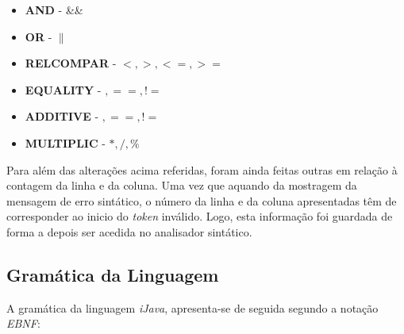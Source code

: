 \documentclass[11pt,a4paper]{article}
\begin{document}
\begin{itemize}
	\item \textbf{AND} - \&\&
	\item \textbf{OR} - $\|$
	\item \textbf{RELCOMPAR} - $< , >, <= , >=$
	\item \textbf{EQUALITY} -  $, == , !=$ 
	\item \textbf{ADDITIVE} - $ , == , != $
	\item \textbf{MULTIPLIC} - $* , / , \% $
\end{itemize}

Para além das alterações acima referidas, foram ainda feitas outras em relação à contagem da linha e da coluna. Uma vez que aquando da mostragem da mensagem de erro sintático, o número da linha e da coluna apresentadas têm de corresponder ao inicio do \emph{token} inválido. Logo, esta informação foi guardada de forma a depois ser acedida no analisador sintático.

\subsection{Gramática da Linguagem}

A gramática da linguagem \emph{iJava}, apresenta-se de seguida segundo a notação \emph{EBNF}: 
\vspace{0.5cm}
\end{document}
